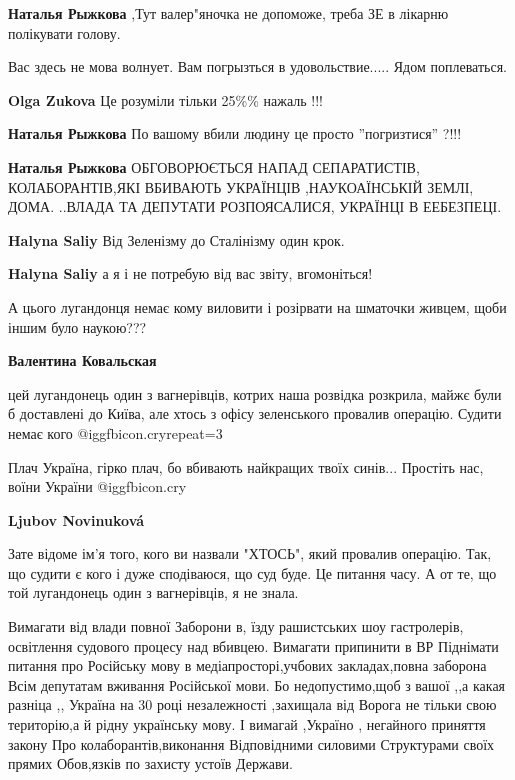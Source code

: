 \begin{itemize}
\begin{itemize}
\textbf{Наталья Рыжкова} ,Тут валер"яночка не допоможе, треба ЗЕ в лікарню полікувати голову.

Вас здесь не мова волнует. Вам погрызться в удовольствие..... Ядом поплеваться.

\textbf{Olga Zukova} Це розуміли тільки 25\%\% нажаль !!!

\textbf{Наталья Рыжкова} По вашому вбили людину це просто ”погризтися” ?!!!

\textbf{Наталья Рыжкова} ОБГОВОРЮЄТЬСЯ НАПАД СЕПАРАТИСТІВ, КОЛАБОРАНТІВ,ЯКІ ВБИВАЮТЬ УКРАЇНЦІВ ,НАУКОАЇНСЬКІЙ ЗЕМЛІ, ДОМА. ..ВЛАДА ТА ДЕПУТАТИ РОЗПОЯСАЛИСЯ, УКРАЇНЦІ В ЕЕБЕЗПЕЦІ.

\textbf{Halyna Saliy}
Від Зеленізму до Сталінізму один крок.

\textbf{Halyna Saliy} а я і не потребую від вас звіту, вгомоніться!
\end{itemize} %


А цього лугандонця немає кому виловити і розірвати на шматочки живцем, щоби
іншим було наукою???

\begin{itemize} %
\textbf{Валентина Ковальская} 

цей лугандонець один з вагнерівців, котрих наша розвідка розкрила, майжє були б
доставлені до Київа, але хтось з офісу зеленського провалив операцію. Судити
немає кого @igg{fbicon.cry}{repeat=3} 

Плач Україна, гірко плач, бо вбивають найкращих твоїх синів... Простіть нас,
воїни України  @igg{fbicon.cry} 


\textbf{Ljubov Novinuková} 

Зате відоме ім'я того, кого ви назвали "ХТОСЬ", який провалив операцію. Так, що
судити є кого і дуже сподіваюся, що суд буде. Це питання часу. А от те, що той
лугандонець один з вагнерівців, я не знала.

\end{itemize} %


\obeycr
Вимагати від влади повної
Заборони в, їзду рашистських шоу гастролерів, освітлення судового процесу над вбивцею.
Вимагати припинити в ВР
Піднімати питання про
Російську мову в медіапросторі,учбових закладах,повна заборона
Всім депутатам вживання
Російської мови.
Бо недопустимо,щоб з вашої ,,а какая разніца ,,
Україна на 30 році незалежності ,захищала від
Ворога не тільки свою територію,а й рідну українську мову.
І вимагай ,Україно , негайного приняття закону
Про колаборантів,виконання
Відповідними силовими
Структурами своїх прямих
Обов,язків по захисту устоїв
Держави.
\restorecr


\end{itemize}
